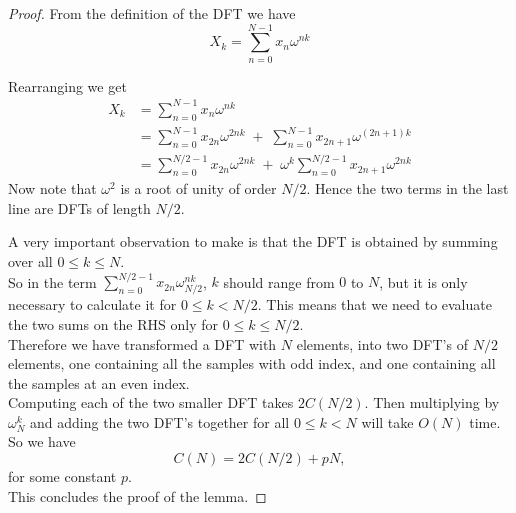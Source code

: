 \begin{proof}
From the definition of the DFT we have
\[
    X_k = \sum^{N-1}_{n=0}x_n\omega^{nk}
\]

Rearranging we get
\begin{align}
    X_k
    &= \sum^{N-1}_{n=0}x_n\omega^{nk} \nonumber\\
    &= \sum^{N-1}_{n=0}x_{2n}\omega^{2nk} \;+\; \sum^{N-1}_{n=0}x_{2n+1} \omega^{(2n+1)k} \nonumber\\
    &= \sum^{N/2-1}_{n=0}x_{2n}\omega^{2nk} \;+\; \omega^k \sum^{N/2-1}_{n=0}x_{2n+1}\omega^{2nk} \label{eq:keystep}
\end{align}
Now note that $\omega^2$ is a root of unity of order $N/2$. Hence the two terms in the last line are DFTs of length $N/2$.

A very important observation to make is that the DFT is obtained by summing over all $0\leq k \leq N$.\\

So in the term $\sum^{N/2-1}_{n=0}x_{2n}\omega^{nk}_{N/2}$, $k$ should range from $0$ to $N$, but it is only necessary to calculate it for $0 \leq k < N/2$. This means that we need to evaluate the two sums on the RHS only for $0 \leq k \leq N/2$.\\

Therefore we have transformed a DFT with $N$ elements, into two DFT's of $N/2$ elements, one containing all the samples with odd index, and one containing all the samples at an even index.\\
Computing each of the two smaller DFT takes $2C(N/2)$. Then multiplying by $\omega^k_N$ and adding the two DFT's together for all $0 \leq k < N$ will take $O(N)$ time. \\
So we have
\[
    C(N) = 2 C(N/2) + pN, \label{eq:recurse}
\]
for some constant $p$.\\
This concludes the proof of the lemma.
\end{proof}





